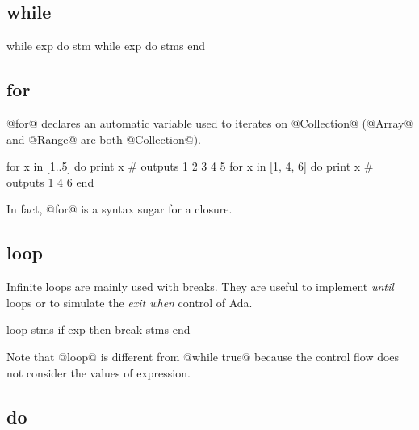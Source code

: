 \subsection{while}\label{while}

\begin{lst}
while exp do stm
while exp do
	stms
end
\end{lst}

\subsection{for}\label{for}

@for@ declares an automatic variable used to iterates on @Collection@ (@Array@ and @Range@ are both @Collection@).

\begin{lst}
for x in [1..5] do print x # outputs 1 2 3 4 5
for x in [1, 4, 6] do
	print x # outputs 1 4 6
end
\end{lst}

In fact, @for@ is a syntax sugar for a closure.

\subsection{loop}\label{loop}

Infinite loops are mainly used with breaks.
They are useful to implement \textit{until} loops or to simulate the \textit{exit when} control of Ada.

\begin{lst}
loop
	stms
	if exp then break
	stms
end
\end{lst}

Note that @loop@ is different from @while true@ because the control flow does not consider the values of expression.

\subsection{do}\label{do}

